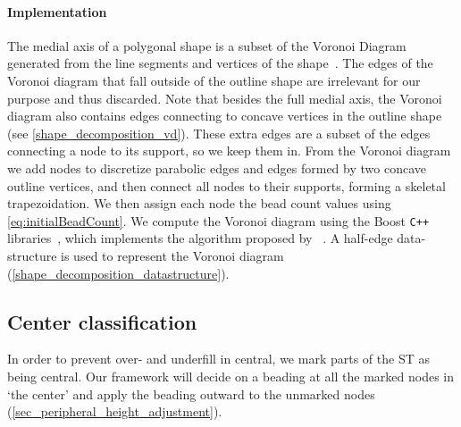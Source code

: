 \paragraph{Implementation}
The medial axis of a polygonal shape is a subset of the Voronoi Diagram generated from the line segments and vertices of the shape~\cite{lee1982medial}. 
The edges of the Voronoi diagram that fall outside of the outline shape are irrelevant for our purpose and thus discarded.
Note that besides the full medial axis, the Voronoi diagram also contains edges connecting to concave vertices in the outline shape (see \cref{shape_decomposition_vd}). 
These extra edges are a subset of the edges connecting a node to its support, so we keep them in.
From the Voronoi diagram we add nodes to discretize parabolic edges and edges formed by two concave outline vertices, and then connect all nodes to their supports, forming a skeletal trapezoidation. 
We then assign each node the bead count values using \cref{eq:initialBeadCount}.
We compute the Voronoi diagram using the Boost \verb!C++! libraries~\cite{schaling2011boost}, which implements the algorithm proposed by \citeauthor{fortune1986sascg}~\cite{fortune1986sascg}.
A half-edge data-structure is used to represent the Voronoi diagram (\cref{shape_decomposition_datastructure}).

%









\subsection{Center classification}\label{sec_center_classification}
In order to prevent over- and underfill  in central, we mark parts of the ST as being central.
Our framework will decide on a beading at all the marked nodes in `the center' and apply the beading outward to the unmarked nodes (\cref{sec_peripheral_height_adjustment}).

